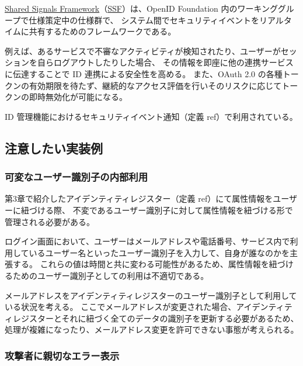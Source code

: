 \documentclass[uplatex]{jsarticle}
\def\ref#1{ref}%
\def\label#1{}%
\begin{document}
\begin{dfn}\label{dfn:ch5-ssf}
\underline{Shared Signals Framework}（\underline{SSF}）は、OpenID Foundation 内のワーキンググループで仕様策定中の仕様群で、
システム間でセキュリティイベントをリアルタイムに共有するためのフレームワークである。
\end{dfn}

\begin{exa}\label{exa:ch5-ssf-usage}
例えば、あるサービスで不審なアクティビティが検知されたり、ユーザーがセッションを自らログアウトしたりした場合、
その情報を即座に他の連携サービスに伝達することで ID 連携による安全性を高める。
また、OAuth 2.0 の各種トークンの有効期限を待たず、継続的なアクセス評価を行いそのリスクに応じてトークンの即時無効化が可能になる。
\end{exa}

ID 管理機能におけるセキュリティイベント通知（定義 \ref{dfn:security-event-notification}）で利用されている。

\subsection{注意したい実装例}

\subsubsection{可変なユーザー識別子の内部利用}

第3章で紹介したアイデンティティレジスター（定義 \ref{dfn:identity-register}）にて属性情報をユーザーに紐づける際、
不変であるユーザー識別子に対して属性情報を紐づける形で管理される必要がある。

ログイン画面において、ユーザーはメールアドレスや電話番号、サービス内で利用しているユーザー名といったユーザー識別子を入力して、自身が誰なのかを主張する。
これらの値は時間と共に変わる可能性があるため、属性情報を紐づけるためのユーザー識別子としての利用は不適切である。

\begin{exa}[メールアドレスをユーザー識別子とした場合]\label{exa:ch5-email-as-identifier}
メールアドレスをアイデンティティレジスターのユーザー識別子として利用している状況を考える。
ここでメールアドレスが変更された場合、アイデンティティレジスターとそれに紐づく全てのデータの識別子を更新する必要があるため、
処理が複雑になったり、メールアドレス変更を許可できない事態が考えられる。
\end{exa}

\subsubsection{攻撃者に親切なエラー表示}
\end{document}
